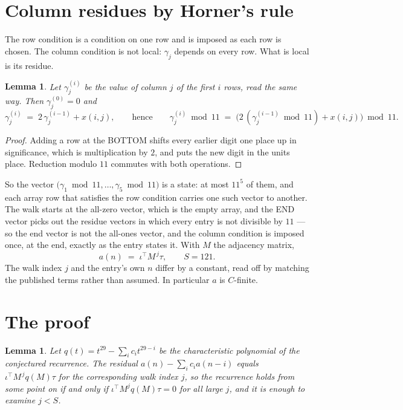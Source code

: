 \documentclass[11pt,a4paper]{article}
\theoremstyle{plain}
\newtheorem{lemma}[theorem]{Lemma}
\theoremstyle{definition}
\begin{document}
\section{Column residues by Horner's rule}

The row condition is a condition on one row and is imposed as each row is chosen. The column
condition is not local: $\gamma_j$ depends on every row. What is local is its residue.

\begin{lemma}\label{lem:horner}
Let $\gamma_j^{(i)}$ be the value of column $j$ of the first $i$ rows, read the same way.
Then $\gamma_j^{(0)}=0$ and
\[
\gamma_j^{(i)}\;=\;2\,\gamma_j^{(i-1)}+x(i,j),
\qquad\text{hence}\qquad
\gamma_j^{(i)}\bmod 11\;=\;
\bigl(2\,(\gamma_j^{(i-1)}\bmod 11)+x(i,j)\bigr)\bmod 11 .
\]
\end{lemma}

\begin{proof}
Adding a row at the BOTTOM shifts every earlier digit one place up in significance, which is
multiplication by $2$, and puts the new digit in the units place. Reduction modulo
$11$ commutes with both operations.
\end{proof}

So the vector $\bigl(\gamma_1\bmod 11,\dots,\gamma_{5}\bmod
11\bigr)$ is a state: at most $11^{5}$ of them, and each array row
that satisfies the row condition carries one such vector to another. The walk starts at the
all-zero vector, which is the empty array, and the END vector picks out the residue vectors in
which every entry is not divisible by $11$ --- so the end vector is not the all-ones
vector, and the column condition is imposed once, at the end, exactly as the entry states it.
With $M$ the adjacency matrix,
\[
a(n)\;=\;\iota^{\!\top}M^{\,j}\tau ,\qquad S=121.
\]
The walk index $j$ and the entry's own $n$ differ by a constant, read off by matching the
published terms rather than assumed. In particular $a$ is $C$-finite.

\section{The proof}

\begin{lemma}\label{lem:crit}
Let $q(t)=t^{29}-\sum_i c_it^{29-i}$ be the characteristic polynomial of the
conjectured recurrence. The residual $a(n)-\sum_ic_ia(n-i)$ equals
$\iota^{\!\top}M^{\,j}q(M)\tau$ for the corresponding walk index $j$, so the recurrence
holds from some point on if and only if $\iota^{\!\top}M^{j}q(M)\tau=0$ for all large $j$,
and it is enough to examine $j<S$.
\end{lemma}
\end{document}
